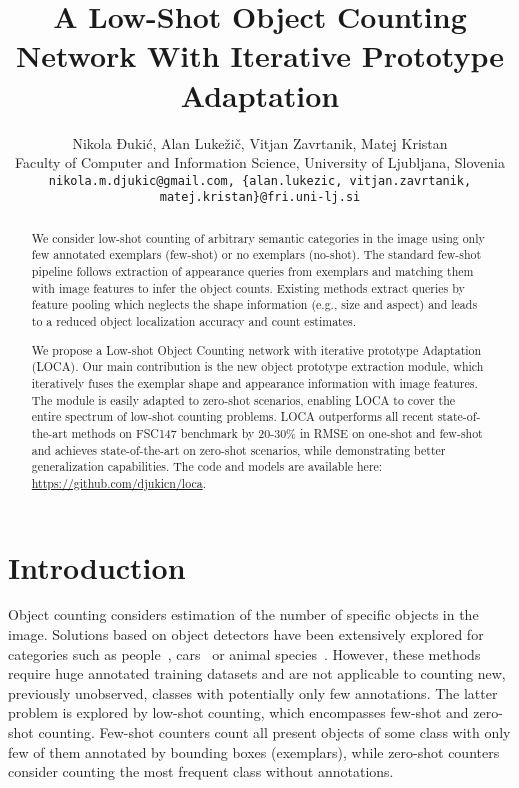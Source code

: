 \documentclass[10pt,twocolumn,letterpaper]{article}
\begin{document}
\title{A Low-Shot Object Counting Network With Iterative Prototype Adaptation}


\author{Nikola Đukić, Alan Lukežič, Vitjan Zavrtanik, Matej Kristan \\
{\small Faculty of Computer and Information Science, University of Ljubljana, Slovenia} \\
{\tt\small nikola.m.djukic@gmail.com, \{alan.lukezic, vitjan.zavrtanik, matej.kristan\}@fri.uni-lj.si}
\vspace{-0.5cm}
}
\maketitle



\begin{abstract}
We consider low-shot counting of arbitrary semantic categories in the image using only few annotated exemplars (few-shot) or no exemplars (no-shot). The standard few-shot pipeline follows extraction of appearance queries from exemplars and matching them with image features to infer the object counts. 
Existing methods extract queries by feature pooling which neglects the shape information (e.g., size and aspect) and leads to a reduced object localization accuracy and count estimates.

We propose a Low-shot Object Counting network with iterative prototype Adaptation (LOCA).
Our main contribution is the new object prototype extraction module, which iteratively fuses the exemplar shape and appearance information with image features.
The module is easily adapted to zero-shot scenarios, enabling LOCA to cover the entire spectrum of low-shot counting problems.
LOCA outperforms all recent state-of-the-art methods on FSC147 benchmark by 20-30\% in RMSE on one-shot and few-shot and achieves state-of-the-art on zero-shot scenarios, while demonstrating better generalization capabilities.
The code and models are available here: \url{https://github.com/djukicn/loca}.
\end{abstract}

\section{Introduction}

Object counting considers estimation of the number of specific objects in the image. Solutions based on object detectors have been extensively explored for categories such as people~\cite{crowdcounting, crowdcounting2}, cars~\cite{cars, carpk} or animal species~\cite{animals, polyps}. However, 
these methods require huge annotated training datasets and are not applicable to counting new, previously unobserved, classes with potentially only few annotations. The latter problem is explored by low-shot counting, which encompasses few-shot and zero-shot counting. Few-shot counters count all present objects of some class with only few of them annotated by bounding boxes (exemplars), while zero-shot counters consider counting the most frequent class without annotations.
\end{document}
